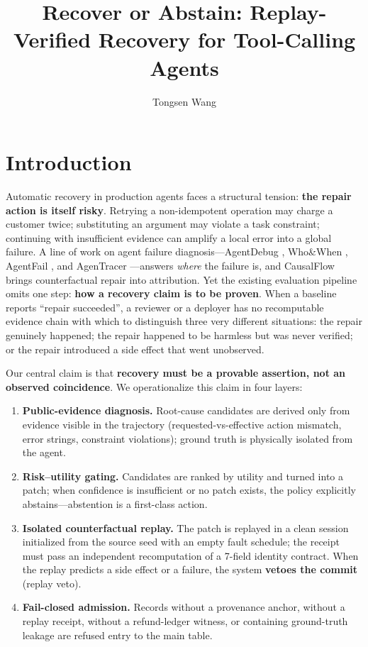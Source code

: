 \documentclass[review]{fcs}
\title{Recover or Abstain: Replay-Verified Recovery for Tool-Calling Agents}
\author[1,+]{Tongsen Wang}
\begin{document}
\section{Introduction}

Automatic recovery in production agents faces a structural tension: \textbf{the repair action is itself risky}. Retrying a non-idempotent operation may charge a customer twice; substituting an argument may violate a task constraint; continuing with insufficient evidence can amplify a local error into a global failure. A line of work on agent failure diagnosis---AgentDebug \cite{ref1}, Who\&When \cite{ref2}, AgentFail \cite{ref3}, and AgenTracer \cite{ref4}---answers \emph{where} the failure is, and CausalFlow \cite{ref5} brings counterfactual repair into attribution. Yet the existing evaluation pipeline omits one step: \textbf{how a recovery claim is to be proven}. When a baseline reports ``repair succeeded'', a reviewer or a deployer has no recomputable evidence chain with which to distinguish three very different situations: the repair genuinely happened; the repair happened to be harmless but was never verified; or the repair introduced a side effect that went unobserved.

Our central claim is that \textbf{recovery must be a provable assertion, not an observed coincidence}. We operationalize this claim in four layers:

\begin{enumerate}

  \item \textbf{Public-evidence diagnosis.} Root-cause candidates are derived only from evidence visible in the trajectory (requested-vs-effective action mismatch, error strings, constraint violations); ground truth is physically isolated from the agent.

  \item \textbf{Risk--utility gating.} Candidates are ranked by utility and turned into a patch; when confidence is insufficient or no patch exists, the policy explicitly abstains---abstention is a first-class action.

  \item \textbf{Isolated counterfactual replay.} The patch is replayed in a clean session initialized from the source seed with an empty fault schedule; the receipt must pass an independent recomputation of a 7-field identity contract. When the replay predicts a side effect or a failure, the system \textbf{vetoes the commit} (replay veto).

  \item \textbf{Fail-closed admission.} Records without a provenance anchor, without a replay receipt, without a refund-ledger witness, or containing ground-truth leakage are refused entry to the main table.

\end{enumerate}
\end{document}
